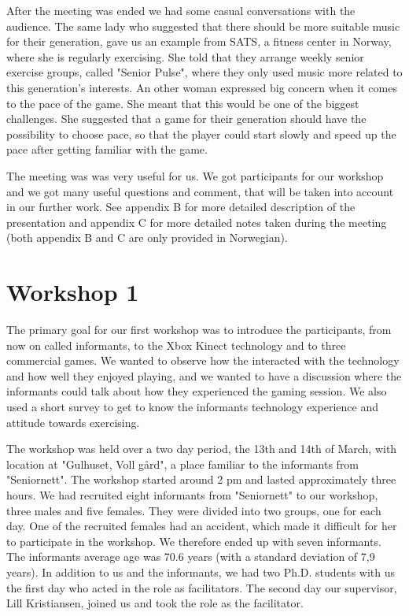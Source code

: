 After the meeting was ended we had some casual conversations with the audience. The same lady who suggested that there should be more suitable music for their generation, gave us an example from SATS, a fitness center in Norway, where she is regularly exercising. She told that they arrange weekly senior exercise groups, called "Senior Pulse", where they only used music more related to this generation's interests. An other woman expressed big concern when it comes to the pace of the game. She meant that this would be one of the biggest challenges. She suggested that a game for their generation should have the possibility to choose pace, so that the player could start slowly and speed up the pace after getting familiar with the game.

The meeting was was very useful for us. We got participants for our workshop and we got many useful questions and comment, that will be taken into account in our further work. See appendix B for more detailed description of the presentation and appendix C for more detailed notes taken during the meeting (both appendix B and C are only provided in Norwegian).
    
\section{Workshop 1}
The primary goal for our first workshop was to introduce the participants, from now on called informants, to the Xbox Kinect technology and to three commercial games. We wanted to observe how the interacted with the technology and how well they enjoyed playing, and we wanted to have a discussion where the informants could talk about how they experienced the gaming session. We also used a short survey to get to know the informants technology experience and attitude towards exercising.    

The workshop was held over a two day period, the 13th and 14th of March, with location at "Gulhuset, Voll gård", a place familiar to the informants from "Seniornett". The workshop started around 2 pm and lasted approximately three hours. We had recruited eight informants from "Seniornett" to our workshop, three males and five females. They were divided into two groups, one for each day. One of the recruited females had an accident, which made it difficult for her to participate in the workshop. We therefore ended up with seven informants. The informants average age was 70.6 years (with a standard deviation of 7,9 years). In addition to us and the informants, we had two Ph.D. students with us the first day who acted in the role as facilitators. The second day our supervisor, Lill Kristiansen, joined us and took the role as the facilitator.   


